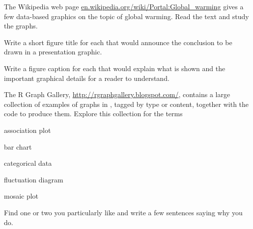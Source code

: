 \begin{Exercises}
 \exercise The Wikipedia web page \url{en.wikipedia.org/wiki/Portal:Global_warming}
   gives a few data-based graphics on the topic of global warming.  
   Read the text and study the graphs.  
   \begin{enumerate*}
	   \item Write a short figure title for each that would announce the conclusion
	   to be drawn in a presentation graphic.  
	   \item Write a figure caption for each that 
	   would explain what is shown and the important graphical details for a reader to
	   understand.
   \end{enumerate*}
   
   \exercise The R Graph Gallery, \url{http://rgraphgallery.blogspot.com/}, contains a large collection of
   examples of graphs in \R, tagged by type or content, together with the \R code to produce them.
   Explore this collection for the terms
   \begin{seriate}
    \item association plot
    \item bar chart
    \item categorical data
    \item fluctuation diagram
    \item mosaic plot
   \end{seriate}
   Find one or two you particularly like and write a few sentences saying why you do.

\end{Exercises}
